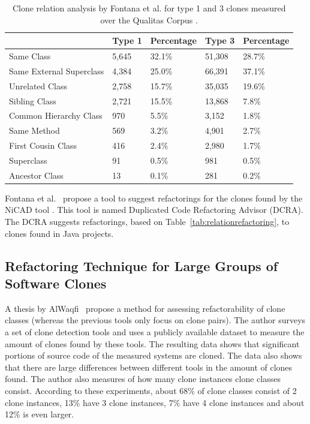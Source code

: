 \begin{table}[H]
\centering
\begin{tabular}{@{}lllll@{}}
\toprule
                         & Type 1 & Percentage & Type 3 & Percentage \\ \midrule
Same Class               & 5,645  & 32.1\%     & 51,308 & 28.7\%     \\
Same External Superclass & 4,384  & 25.0\%     & 66,391 & 37.1\%     \\
Unrelated Class          & 2,758  & 15.7\%     & 35,035 & 19.6\%     \\
Sibling Class            & 2,721  & 15.5\%     & 13,868 & 7.8\%      \\
Common Hierarchy Class   & 970    & 5.5\%      & 3,152  & 1.8\%      \\
Same Method              & 569    & 3.2\%      & 4,901  & 2.7\%      \\
First Cousin Class       & 416    & 2.4\%      & 2,980  & 1.7\%      \\
Superclass               & 91     & 0.5\%      & 981    & 0.5\%      \\
Ancestor Class           & 13     & 0.1\%      & 281    & 0.2\%      \\ \bottomrule
\end{tabular}
\caption{Clone relation analysis by Fontana et al. \cite{fontana2012duplicated} for type 1 and 3 clones measured over the Qualitas Corpus \cite{tempero2010qualitas}.}
\label{tab:dcra-relation}
\end{table}

Fontana et al.~\cite{fontana2012duplicated, fontana2015duplicated} propose a tool to suggest refactorings for the clones found by the NiCAD tool \cite{roy2008nicad, cordy2011nicad}. This tool is named Duplicated Code Refactoring Advisor (DCRA). The DCRA suggests refactorings, based on Table~\ref{tab:relationrefactoring}, to clones found in Java projects.

\subsection{Refactoring Technique for Large Groups of Software Clones}
A thesis by AlWaqfi~\cite{alwaqfi2017refactoring} propose a method for assessing refactorability of clone classes (whereas the previous tools only focus on clone pairs). The author surveys a set of clone detection tools \cite{kamiya2002ccfinder, baxter1999clonedr, jiang2007deckard, cordy2011nicad} and uses a publicly available dataset \cite{tsantalis2015assessing} to measure the amount of clones found by these tools. The resulting data shows that significant portions of source code of the measured systems are cloned. The data also shows that there are large differences between different tools in the amount of clones found. The author also measures of how many clone instances clone classes consist. According to these experiments, about 68\% of clone classes consist of 2 clone instances, 13\% have 3 clone instances, 7\% have 4 clone instances and about 12\% is even larger.

